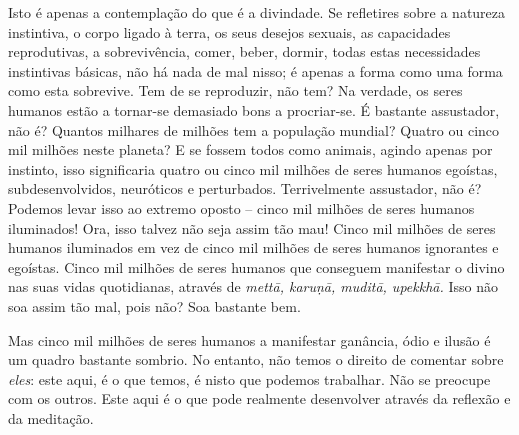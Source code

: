 Isto é apenas a contemplação do que é a divindade. Se refletires sobre a
natureza instintiva, o corpo ligado à terra, os seus desejos sexuais, as
capacidades reprodutivas, a sobrevivência, comer, beber, dormir, todas estas
necessidades instintivas básicas, não há nada de mal nisso; é apenas a forma
como uma forma como esta sobrevive. Tem de se reproduzir, não tem? Na verdade,
os seres humanos estão a tornar-se demasiado bons a procriar-se. É bastante
assustador, não é? Quantos milhares de milhões tem a população mundial? Quatro
ou cinco mil milhões neste planeta? E se fossem todos como animais, agindo
apenas por instinto, isso significaria quatro ou cinco mil milhões de seres
humanos egoístas, subdesenvolvidos, neuróticos e perturbados. Terrivelmente
assustador, não é? Podemos levar isso ao extremo oposto -- cinco mil milhões de
seres humanos iluminados! Ora, isso talvez não seja assim tão mau! Cinco mil
milhões de seres humanos iluminados em vez de cinco mil milhões de seres humanos
ignorantes e egoístas. Cinco mil milhões de seres humanos que conseguem
manifestar o divino nas suas vidas quotidianas, através de \emph{mettā, karuṇā,
  muditā, upekkhā.} Isso não soa assim tão mal, pois não? Soa bastante bem.

Mas cinco mil milhões de seres humanos a manifestar ganância, ódio e ilusão é um
quadro bastante sombrio. No entanto, não temos o direito de comentar sobre
\emph{eles}: este aqui, é o que temos, é nisto que podemos trabalhar. Não se
preocupe com os outros. Este aqui é o que pode realmente desenvolver através da
reflexão e da meditação.

